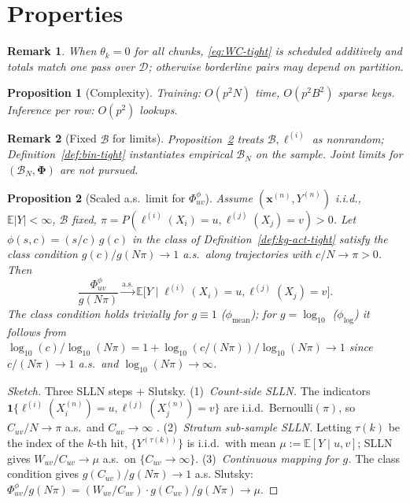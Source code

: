 \documentclass[11pt]{article}
\newtheorem{remark}{Remark}
\newtheorem{proposition}{Proposition}
\begin{document}
\section{Properties}
\begin{remark}
When $\theta_k=0$ for all chunks, \eqref{eq:WC-tight} is scheduled additively and totals match one pass over $\mathcal{D}$; otherwise borderline pairs may depend on partition.
\end{remark}

\begin{proposition}[Complexity]
Training: $O(p^2N)$ time, $O(p^2B^2)$ sparse keys.
Inference per row: $O(p^2)$ lookups.
\end{proposition}

\begin{remark}[Fixed $\mathcal{B}$ for limits]
\label{rem:fixed-tight}
Proposition~\ref{prop:conv-tight} treats $\mathcal{B},\ell^{(i)}$ as nonrandom; Definition~\ref{def:bin-tight} instantiates empirical $\mathcal{B}_N$ on the sample.
Joint limits for $(\mathcal{B}_N,\bm{\Phi})$ are not pursued.
\end{remark}

\begin{proposition}[Scaled a.s.\ limit for $\Phi^\phi_{uv}$]
\label{prop:conv-tight}
Assume $(\bm{x}^{(n)},Y^{(n)})$ i.i.d., $\mathbb{E}|Y|<\infty$, $\mathcal{B}$ fixed, $\pi=P(\ell^{(i)}(X_i)=u,\ell^{(j)}(X_j)=v)>0$.
Let $\phi(s,c)=(s/c)\,g(c)$ in the class of Definition~\ref{def:kg-act-tight} satisfy the \emph{class condition} $g(c)/g(N\pi)\to 1$ a.s.\ along trajectories with $c/N\to\pi>0$.
Then
\[
\frac{\Phi^\phi_{uv}}{g(N\pi)}\xrightarrow{\mathrm{a.s.}} \mathbb{E}\bigl[Y\mid \ell^{(i)}(X_i)=u,\ell^{(j)}(X_j)=v\bigr].
\]
The class condition holds trivially for $g\equiv 1$ ($\phi_{\mathrm{mean}}$); for $g=\log_{10}$ ($\phi_{\log}$) it follows from $\log_{10}(c)/\log_{10}(N\pi)=1+\log_{10}(c/(N\pi))/\log_{10}(N\pi)\to 1$ since $c/(N\pi)\to 1$ a.s.\ and $\log_{10}(N\pi)\to\infty$.
\end{proposition}
\begin{proof}[Sketch]
Three SLLN steps + Slutsky.
(1)~\emph{Count-side SLLN.} The indicators $\mathbf 1\{\ell^{(i)}(X_i^{(n)})=u,\ell^{(j)}(X_j^{(n)})=v\}$ are i.i.d.\ Bernoulli$(\pi)$, so $C_{uv}/N\to\pi$ a.s.\ and $C_{uv}\to\infty$ \cite[Thm.~2.4.1]{Durrett2019}.
(2)~\emph{Stratum sub-sample SLLN.} Letting $\tau(k)$ be the index of the $k$-th hit, $\{Y^{(\tau(k))}\}$ is i.i.d.\ with mean $\mu:=\mathbb{E}[Y\mid u,v]$; SLLN \cite[Thm.~2.4.1]{Durrett2019} gives $W_{uv}/C_{uv}\to\mu$ a.s.\ on $\{C_{uv}\to\infty\}$.
(3)~\emph{Continuous mapping for $g$.} The class condition gives $g(C_{uv})/g(N\pi)\to 1$ a.s.
Slutsky: $\Phi^\phi_{uv}/g(N\pi)=(W_{uv}/C_{uv})\cdot g(C_{uv})/g(N\pi)\to \mu$.
\end{proof}
\end{document}
